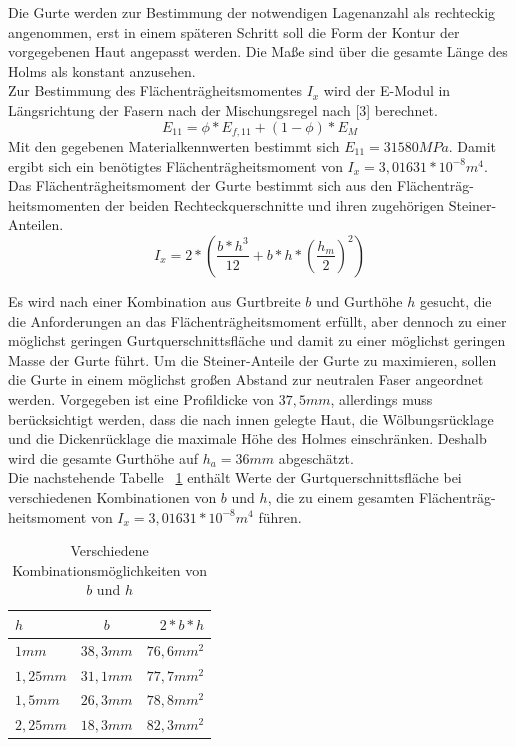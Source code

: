 \noindent Die Gurte werden zur Bestimmung der notwendigen Lagenanzahl als rechteckig angenommen, erst in einem späteren Schritt soll die Form der Kontur der vorgegebenen Haut angepasst werden. Die Maße sind über die gesamte Länge des Holms als konstant anzusehen.\\
Zur Bestimmung des Flächenträgheitsmomentes $ I_{x} $ wird der E-Modul in Längsrichtung der Fasern nach der Mischungsregel nach [3] berechnet.\\
\begin{equation}
 E_{11}=  \phi*E_{f,11}+\left( 1-\phi \right) * E_{M}
\end{equation}
Mit den gegebenen Materialkennwerten bestimmt sich $ E_{11} = 31580 MPa $. Damit ergibt sich ein benötigtes Flächenträgheitsmoment von $ I_{x} = 3,01631 * 10^{-8} m^{4} $.\\

\noindent Das Flächenträgheitsmoment der Gurte bestimmt sich aus den Flächenträg-heitsmomenten der beiden Rechteckquerschnitte und ihren zugehörigen Steiner-Anteilen.
\begin{equation}
	\label{Ix}
	I_{x}=2*\left(\frac{b*h^{3}}{12}+b*h*\left(\frac{h_{m}}{2}\right)^{2}\right)
\end{equation}

\noindent Es wird nach einer Kombination aus Gurtbreite $ b $ und Gurthöhe $ h $ gesucht, die die Anforderungen an das Flächenträgheitsmoment erfüllt, aber dennoch zu einer möglichst geringen Gurtquerschnittsfläche und damit zu einer möglichst geringen Masse der Gurte führt. Um die Steiner-Anteile der Gurte zu maximieren, sollen die Gurte in einem möglichst großen Abstand zur neutralen Faser angeordnet werden. Vorgegeben ist eine Profildicke von $ 37,5mm $, allerdings muss berücksichtigt werden, dass die nach innen gelegte Haut, die Wölbungsrücklage und die Dickenrücklage die maximale Höhe des Holmes einschränken. Deshalb wird die gesamte Gurthöhe auf $ h_{a}=36mm $ abgeschätzt.\\ 

\noindent Die nachstehende Tabelle ~\ref{bh} enthält Werte der Gurtquerschnittsfläche bei verschiedenen Kombinationen von $ b $ und $ h $, die zu einem gesamten Flächenträg-heitsmoment von $ I_{x} = 3,01631 * 10^{-8} m^{4} $ führen.\\
\begin{table}
	\caption{Verschiedene Kombinationsmöglichkeiten von $ b $ und $ h $}
	\label{bh}
	\begin{center}
		\begin{tabular}{l|c|r}
			$h$&$b$&$2*b*h$\\
			\hline
			$1mm$&$38,3mm$&$76,6mm^{2}$\\
			$1,25mm$&$31,1mm$&$77,7mm^{2}$\\
			$1,5mm$&$26,3mm$&$78,8mm^{2}$\\
			$2,25mm$&$18,3mm$&$82,3mm^{2}$\\
		\end{tabular}
	\end{center}
\end{table}



